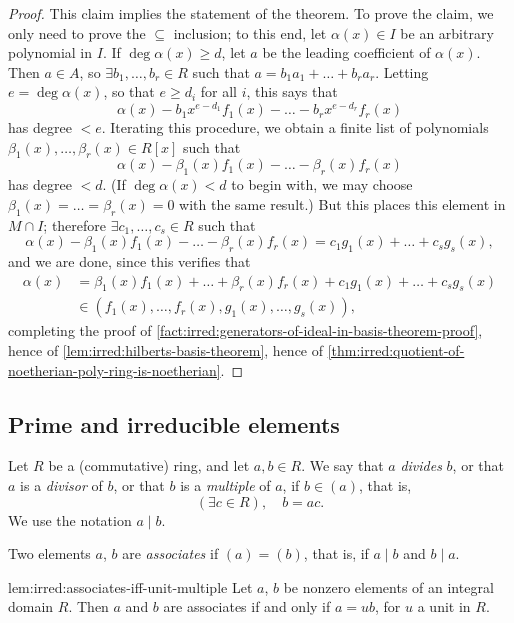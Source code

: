 \begin{proof}
This claim implies the statement of the theorem. To prove the claim,
we only need to prove the $\subseteq$ inclusion; to this end, let
$\alpha(x) \in I$ be an arbitrary polynomial in $I$. If
$\deg\alpha(x) \geq d$, let $a$ be the leading coefficient of
$\alpha(x)$. Then $a \in A$, so $\exists b_1, \dots, b_r \in R$ such
that $a = b_1 a_1 + \dots + b_r a_r$. Letting $e = \deg\alpha(x)$, so
that $e \geq d_i$ for all $i$, this says that
\[\alpha(x) - b_1 x^{e-d_1} f_1(x) - \dots - b_r x^{e-d_r} f_r(x)\]
has degree $< e$. Iterating this procedure, we obtain a finite list of
polynomials $\beta_1(x), \dots, \beta_r(x) \in R[x]$ such that
\[\alpha(x) - \beta_1(x) f_1(x) - \dots - \beta_r(x) f_r(x)\]
has degree $< d$. (If $\deg\alpha(x) < d$ to begin with, we may choose
$\beta_1(x) = \dots = \beta_r(x) = 0$ with the same result.) But this
places this element in $M \cap I$;
therefore $\exists c_1, \dots, c_s \in R$ such that
\[\alpha(x) - \beta_1(x)f_1(x) - \dots - \beta_r(x)f_r(x)
  = c_1 g_1(x) + \dots + c_s g_s(x),\] and we are done, since this
verifies that
\begin{align*}
  \alpha(x) &= \beta_1(x)f_1(x) + \dots + \beta_r(x)f_r(x)
              + c_1 g_1(x) + \dots + c_s g_s(x) \\
            &\in (f_1(x), \dots, f_r(x), g_1(x), \dots, g_s(x)),
\end{align*}
completing the proof of \cref{fact:irred:generators-of-ideal-in-basis-theorem-proof}, hence of
\cref{lem:irred:hilberts-basis-theorem}, hence of \cref{thm:irred:quotient-of-noetherian-poly-ring-is-noetherian}.
\end{proof}

\subsection{Prime and irreducible elements}
\label{subsec:irred:prime-and-irreducible-elements}
Let $R$ be a (commutative) ring, and let $a, b \in R$. We say that $a$
\emph{divides} $b$, or that $a$ is a \emph{divisor} of $b$, or that
$b$ is a \emph{multiple} of $a$, if $b \in (a)$, that is,
\[(\exists c \in R),\quad b = ac.\] We use the notation $a \mid b$.

Two elements $a$, $b$ are \emph{associates} if $(a) = (b)$, that is,
if $a \mid b$ and $b \mid a$.
\begin{lem}{}{lem:irred:associates-iff-unit-multiple}
  Let $a$, $b$ be nonzero elements of an integral domain $R$. Then $a$
  and $b$ are associates if and only if $a = ub$, for $u$ a unit in
  $R$.
\end{lem}

